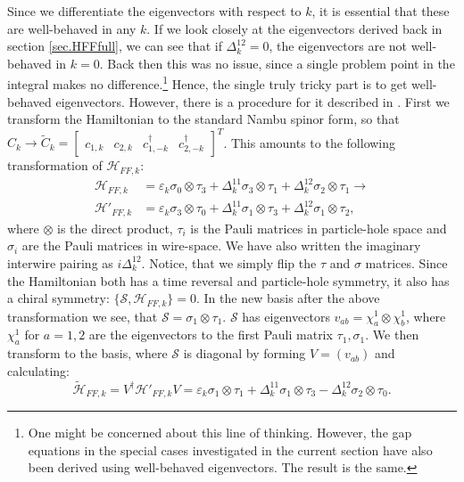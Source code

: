 Since we differentiate the eigenvectors with respect to $k$, it is essential that these are well-behaved in any $k$. If we look closely at the eigenvectors derived back in section \ref{sec.HFFfull}, we can see that if $\Delta^{12}_k = 0$, the eigenvectors are not well-behaved in $k = 0$. Back then this was no issue, since a single problem point in the integral makes no difference.\footnote{One might be concerned about this line of thinking. However, the gap equations in the special cases investigated in the current section have also been derived using well-behaved eigenvectors. The result is the same.} Hence, the single truly tricky part is to get well-behaved eigenvectors. However, there is a procedure for it described in \cite{Ryu.Topology}. First we transform the Hamiltonian to the standard Nambu spinor form, so that $C_k \to \tilde{C}_k = \begin{bmatrix} c_{1,k} & c_{2,k} & c^\dagger_{1,-k} & c^\dagger_{2,-k}  \end{bmatrix}^{T}$. This amounts to the following transformation of $\mathcal{H}_{FF,k}$:
\begin{align}
\mathcal{H}_{FF,k} &= \varepsilon_k \sigma_0 \otimes \tau_3 + \Delta^{11}_k \sigma_3 \otimes \tau_1 + \Delta^{12}_k \sigma_2 \otimes \tau_1 \to \nonumber \\
\mathcal{H}'_{FF,k} &= \varepsilon_k \sigma_3 \otimes \tau_0 + \Delta^{11}_k \sigma_1 \otimes \tau_3 + \Delta^{12}_k \sigma_1 \otimes \tau_2, \nonumber 
\end{align}
where $\otimes$ is the direct product, $\tau_i$ is the Pauli matrices in particle-hole space and $\sigma_i$ are the Pauli matrices in wire-space. We have also written the imaginary interwire pairing as $i\Delta^{12}_k$. Notice, that we simply flip the $\tau$ and $\sigma$ matrices. Since the Hamiltonian both has a time reversal and particle-hole symmetry, it also has a chiral symmetry: $\{\mathcal{S}, \mathcal{H}_{FF,k}\} = 0$. In the new basis after the above transformation we see, that $\mathcal{S} = \sigma_1\otimes \tau_1$. $\mathcal{S}$ has eigenvectors $v_{ab} = \chi^{1}_a\otimes \chi^{1}_b$, where $\chi^{1}_a$ for $a = 1,2$ are the eigenvectors to the first Pauli matrix $\tau_1, \sigma_1$. We then transform to the basis, where $\mathcal{S}$ is diagonal by forming $V = (v_{ab})$ and calculating:
\begin{equation}
\tilde{\mathcal{H}}_{FF,k} = V^\dagger\mathcal{H}'_{FF,k}V = \varepsilon_k \sigma_1\otimes \tau_1 + \Delta^{11}_k \sigma_1\otimes\tau_3 - \Delta^{12}_k\sigma_2\otimes\tau_0. \nonumber 
\end{equation}
